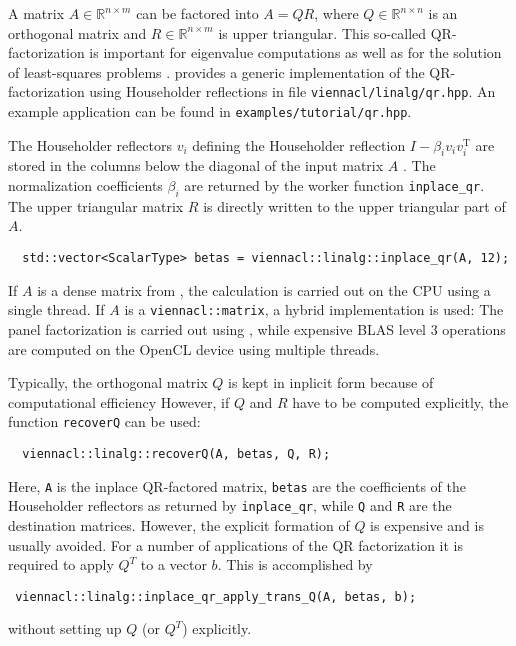 A matrix $A \in \mathbb{R}^{n\times m}$ can be factored into $A = Q R$, where $Q \in \mathbb{R}^{n\times n}$ is an
orthogonal matrix and $R \in \mathbb{R}^{n \times m}$ is upper triangular. This so-called QR-factorization is important for eigenvalue computations as well as
for the solution of least-squares problems \cite{golub:matrix-computations}. {\ViennaCL} provides a generic implementation of the QR-factorization using
Householder reflections in file \lstinline|viennacl/linalg/qr.hpp|. An example application can be found in \lstinline|examples/tutorial/qr.hpp|.

The Householder reflectors $v_i$ defining the Householder reflection $I - \beta_i v_i v_i^{\mathrm{T}}$ are stored in the
columns below the diagonal of the input matrix $A$ \cite{golub:matrix-computations}. The normalization coefficients $\beta_i$ are returned by the
worker function \lstinline|inplace_qr|. The upper triangular matrix $R$ is directly written to the upper triangular part of $A$.
\begin{lstlisting}
  std::vector<ScalarType> betas = viennacl::linalg::inplace_qr(A, 12);
\end{lstlisting}
If $A$ is a dense matrix from \ublas, the calculation is carried out on the CPU using a single thread. If $A$ is a
\lstinline|viennacl::matrix|, a hybrid implementation is used: The panel factorization is carried out using \ublas, while expensive BLAS level 3 operations
are computed on the OpenCL device using multiple threads.

Typically, the orthogonal matrix $Q$ is kept in inplicit form because of computational efficiency
However, if $Q$ and $R$ have to be computed explicitly, the function \lstinline|recoverQ| can be used:
\begin{lstlisting}
  viennacl::linalg::recoverQ(A, betas, Q, R);
\end{lstlisting}
Here, \lstinline|A| is the inplace QR-factored matrix, \lstinline|betas| are the coefficients of the Householder reflectors as returned by
\lstinline|inplace_qr|, while \lstinline|Q| and \lstinline|R| are the destination matrices. However, the explicit formation of $Q$ is expensive and is usually avoided.
For a number of applications of the QR factorization it is required to apply $Q^T$ to a vector $b$. This is accomplished by
\begin{lstlisting}
 viennacl::linalg::inplace_qr_apply_trans_Q(A, betas, b);
\end{lstlisting}
without setting up $Q$ (or $Q^T$) explicitly.

